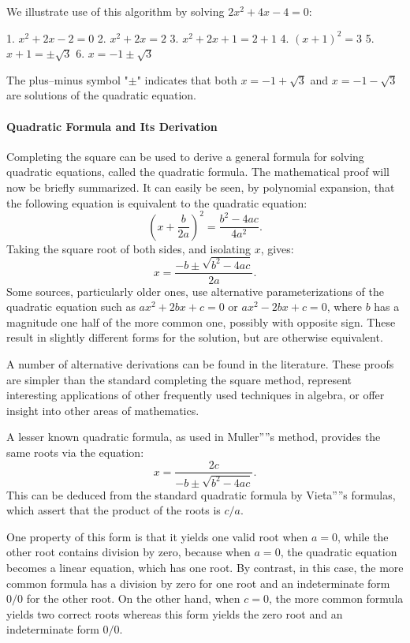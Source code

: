 We illustrate use of this algorithm by solving $2x^2 + 4x - 4 = 0$:

1. $x^2 + 2x - 2 = 0$
2. $x^2 + 2x = 2$
3. $x^2 + 2x + 1 = 2 + 1$
4. $(x + 1)^2 = 3$
5. $x + 1 = \pm \sqrt{3}$
6. $x = -1 \pm \sqrt{3}$

The plus–minus symbol "$\pm$" indicates that both $x = -1 + \sqrt{3}$ and $x = -1 - \sqrt{3}$ are solutions of the quadratic equation.

\paragraph{Quadratic Formula and Its Derivation}

Completing the square can be used to derive a general formula for solving quadratic equations, called the quadratic formula. The mathematical proof will now be briefly summarized. It can easily be seen, by polynomial expansion, that the following equation is equivalent to the quadratic equation:
$$
\left(x + \frac{b}{2a}\right)^2 = \frac{b^2 - 4ac}{4a^2}.
$$
Taking the square root of both sides, and isolating $x$, gives:
$$
x = \frac{-b \pm \sqrt{b^2 - 4ac}}{2a}.
$$
Some sources, particularly older ones, use alternative parameterizations of the quadratic equation such as $ax^2 + 2bx + c = 0$ or $ax^2 - 2bx + c = 0$, where $b$ has a magnitude one half of the more common one, possibly with opposite sign. These result in slightly different forms for the solution, but are otherwise equivalent.

A number of alternative derivations can be found in the literature. These proofs are simpler than the standard completing the square method, represent interesting applications of other frequently used techniques in algebra, or offer insight into other areas of mathematics.

A lesser known quadratic formula, as used in Muller''''s method, provides the same roots via the equation:
$$
x = \frac{2c}{-b \pm \sqrt{b^2 - 4ac}}.
$$
This can be deduced from the standard quadratic formula by Vieta''''s formulas, which assert that the product of the roots is $c/a$.

One property of this form is that it yields one valid root when $a = 0$, while the other root contains division by zero, because when $a = 0$, the quadratic equation becomes a linear equation, which has one root. By contrast, in this case, the more common formula has a division by zero for one root and an indeterminate form $0/0$ for the other root. On the other hand, when $c = 0$, the more common formula yields two correct roots whereas this form yields the zero root and an indeterminate form $0/0$.

